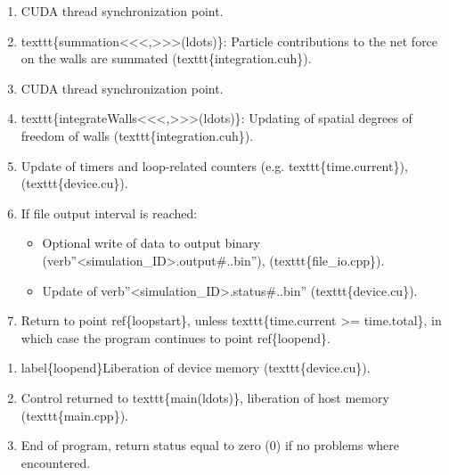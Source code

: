 \documentclass[letterpaper,10pt,english]{sphinxmanual}
\begin{document}
\begin{enumerate}
\item {} 
CUDA thread synchronization point.

\item {} 
texttt\{summation\textless{}\textless{}\textless{},\textgreater{}\textgreater{}\textgreater{}(ldots)\}: Particle contributions to the net force on the walls are summated (texttt\{integration.cuh\}).

\item {} 
CUDA thread synchronization point.

\item {} 
texttt\{integrateWalls\textless{}\textless{}\textless{},\textgreater{}\textgreater{}\textgreater{}(ldots)\}: Updating of spatial degrees of freedom of walls (texttt\{integration.cuh\}).

\item {} 
Update of timers and loop-related counters (e.g. texttt\{time.current\}), (texttt\{device.cu\}).

\item {} 
If file output interval is reached:
\begin{itemize}
\item {} 
Optional write of data to output binary (verb''\textless{}simulation\_ID\textgreater{}.output\#..bin''), (texttt\{file\_io.cpp\}).

\item {} 
Update of verb''\textless{}simulation\_ID\textgreater{}.status\#..bin'' (texttt\{device.cu\}).

\end{itemize}

\item {} 
Return to point ref\{loopstart\}, unless texttt\{time.current \textgreater{}= time.total\}, in which case the program continues to point ref\{loopend\}.

\end{enumerate}
\begin{enumerate}
\item {} 
label\{loopend\}Liberation of device memory (texttt\{device.cu\}).

\item {} 
Control returned to texttt\{main(ldots)\}, liberation of host memory (texttt\{main.cpp\}).

\item {} 
End of program, return status equal to zero (0) if no problems where encountered.

\end{enumerate}
\end{document}
